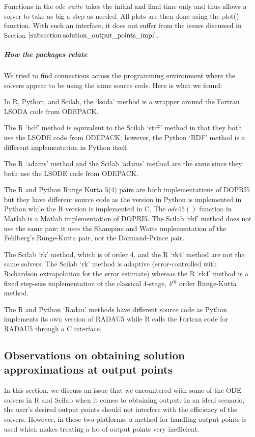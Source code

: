 Functions in the $ode$ $suite$ takes the initial and final time only and thus allows a solver to take as big a step as needed. All plots are then done using the plot() function. With such an interface, it does not suffer from the issues discussed in Section $\ref{subsection:solution_output_points_impl}$. 

\subparagraph{How the packages relate}
We tried to find connections across the programming environment where the solvers appear to be using the same source code.
Here is what we found:

In R, Python, and Scilab, the `lsoda' method is a wrapper around the Fortran LSODA code from ODEPACK.

The R `bdf' method is equivalent to the Scilab `stiff' method in that they both use the LSODE code from ODEPACK; however, the Python `BDF' method is a different implementation in Python itself.

The R `adams' method and the Scilab `adams' method are the same since they both use the LSODE code from ODEPACK.

The R and Python Runge Kutta 5(4) pairs are both implementations of DOPRI5 but they have different source code as the version in Python is implemented in Python while the R version is implemented in C. The $ode45()$ function in Matlab is a Matlab implementation of DOPRI5. The Scilab `rkf' method does not use the same pair; it uses the Shampine and Watts implementation of the Fehlberg's Runge-Kutta pair, not the Dormand-Prince pair. 

The Scilab `rk' method, which is of order 4, and the R `rk4' method are not the same solvers. The Scilab `rk' method is adaptive (error-controlled with Richardson extrapolation for the error estimate) whereas the R `rk4' method is a fixed step-size implementation of the classical 4-stage, 4$^{th}$ order Runge-Kutta method.

The R and Python `Radau' methods have different source code as Python implements its own version of RADAU5 while R calls the Fortran code for RADAU5 through a C interface.

\subsection{Observations on obtaining solution approximations at output points}
\label{subsection:solution_output_points_impl}
In this section, we discuss an issue that we encountered with some of the ODE solvers in R and Scilab when it comes to obtaining output. In an ideal scenario, the user's desired output points should not interfere with the efficiency of the solvers. However, in these two platforms, a method for handling output points is used which makes treating a lot of output points very inefficient.

